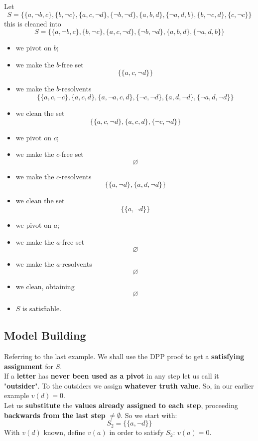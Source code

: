 \begin{example}
	Let 
	$$S = \{\{a, \neg b, c\}, \{b, \neg c\}, \{a, c, \neg d\}, \{\neg b, \neg d\}, \{a, b, d\}, \{\neg a, d, b\}, \{b, \neg c, d\}, \{c, \neg c\}\} $$
	this is cleaned into
	$$S = \{\{a, \neg b, c\}, \{b, \neg c\}, \{a, c, \neg d\}, \{\neg b, \neg d\}, \{a, b, d\}, \{\neg a, d, b\} \} $$
	\begin{itemize}
		\item we pivot on $b$;
		\item we make the $b$-free set
		$$ \{ \{a, c, \neg d\} \} $$
		\item we make the $b$-resolvents
		$$ \{\{a, c, \neg c\}, \{a, c, d\}, \{a, \neg a, c, d\}, \{\neg c, \neg d\}, \{a, d, \neg d\}, \{\neg a, d, \neg d\} \} $$ 
		\item we clean the set
		$$ \{\{a, c, \neg d\}, \{a, c, d\}, \{\neg c, \neg d\} \} $$
		\item we pivot on $c$;
		\item we make the $c$-free set
		$$ \varnothing $$
		\item we make the $c$-resolvents
		$$ \{ \{a, \neg d\}, \{a, d, \neg d\} \} $$
		\item we clean the set
		$$ \{ \{a, \neg d\} \} $$
		\item we pivot on $a$;
		\item we make the $a$-free set
		$$ \varnothing $$
		\item we make the $a$-resolvents
		$$ \varnothing $$
		\item we clean, obtaining
		$$ \varnothing $$
		\item $S$ is satisfiable.
	\end{itemize}
\end{example}

\newpage

\subsection{Model Building}

Referring to the last example. We shall use the DPP proof to get a \textbf{satisfying assignment} for $S$.\\

If a \textbf{letter} has \textbf{never been used as a pivot} in any step let us call it "\textbf{outsider}". To the outsiders we assign \textbf{whatever truth value}. So, in our earlier example $v(d) = 0$.\\

Let us \textbf{substitute} the \textbf{values already assigned to each step}, proceeding \textbf{backwards from the last step} $\neq \emptyset$. So we start with:
$$ S_2 = \{\{a, \neg d\}\} $$
With $v(d)$ known, define $v(a)$ in order to satisfy $S_2$: $v(a) = 0$.\\

